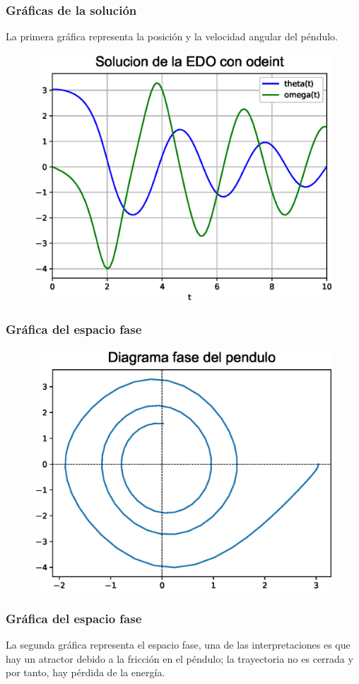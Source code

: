 \begin{frame}[plain]
\frametitle{Gráficas de la solución}
La primera gráfica representa la posición y la velocidad angular del péndulo.
\begin{figure}[h!]
    \centering
    \includegraphics[scale=0.5]{Imagenes/sol_odeint_01.eps}
\end{figure}
\end{frame}
\begin{frame}[plain]
\frametitle{Gráfica del espacio fase}
\begin{figure}[h!]
    \centering
    \includegraphics[scale=0.5]{Imagenes/sol_odeint_02.eps}
\end{figure}
\end{frame}
\begin{frame}
\frametitle{Gráfica del espacio fase}
La segunda gráfica representa el espacio fase, una de las interpretaciones es que hay un atractor debido a la fricción en el péndulo; la trayectoria no es cerrada y por tanto, hay pérdida de la energía.
\end{frame}
